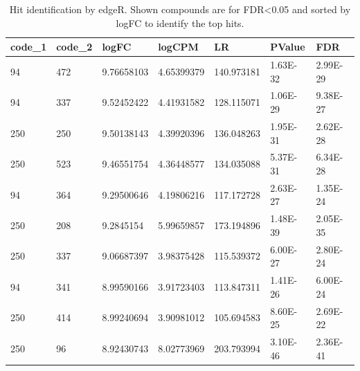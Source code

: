 \begin{table}[htbp]
\centering
\caption{Hit identification by edgeR. Shown compounds are for FDR\textless{}0.05 and sorted by logFC to identify the top hits.}
\label{tab:table12}
\begin{tabular}{lllllll}
\toprule
code\_1 & code\_2 & logFC & logCPM & LR & PValue & FDR \\
\midrule
94 & 472 & 9.76658103 & 4.65399379 & 140.973181 & 1.63E-32 & 2.99E-29 \\
94 & 337 & 9.52452422 & 4.41931582 & 128.115071 & 1.06E-29 & 9.38E-27 \\
250 & 250 & 9.50138143 & 4.39920396 & 136.048263 & 1.95E-31 & 2.62E-28 \\
250 & 523 & 9.46551754 & 4.36448577 & 134.035088 & 5.37E-31 & 6.34E-28 \\
94 & 364 & 9.29500646 & 4.19806216 & 117.172728 & 2.63E-27 & 1.35E-24 \\
250 & 208 & 9.2845154 & 5.99659857 & 173.194896 & 1.48E-39 & 2.05E-35 \\
250 & 337 & 9.06687397 & 3.98375428 & 115.539372 & 6.00E-27 & 2.80E-24 \\
94 & 341 & 8.99590166 & 3.91723403 & 113.847311 & 1.41E-26 & 6.00E-24 \\
250 & 414 & 8.99240694 & 3.90981012 & 105.694583 & 8.60E-25 & 2.69E-22 \\
250 & 96 & 8.92430743 & 8.02773969 & 203.793994 & 3.10E-46 & 2.36E-41 \\
\bottomrule
\end{tabular}
\end{table}
